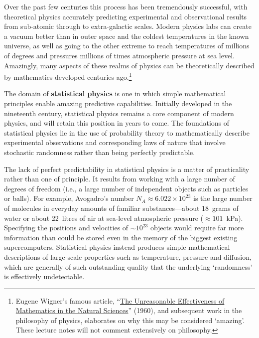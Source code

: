 \documentclass[12 pt]{article}
\begin{document}
Over the past few centuries this process has been tremendously successful, with theoretical physics accurately predicting experimental and observational results from sub-atomic through to extra-galactic scales.
Modern physics labs can create a vacuum better than in outer space and the coldest temperatures in the known universe, as well as going to the other extreme to reach temperatures of millions of degrees and pressures millions of times atmospheric pressure at sea level.
Amazingly, many aspects of these realms of physics can be theoretically described by mathematics developed centuries ago.\footnote{Eugene Wigner's famous article, ``\href{https://en.wikipedia.org/wiki/The_Unreasonable_Effectiveness_of_Mathematics_in_the_Natural_Sciences}{The Unreasonable Effectiveness of Mathematics in the Natural Sciences}'' (1960), and subsequent work in the philosophy of physics, elaborates on why this may be considered `amazing'.  These lecture notes will not comment extensively on philosophy.}

The domain of \textbf{statistical physics} is one in which simple mathematical principles enable amazing predictive capabilities.
Initially developed in the nineteenth century, statistical physics remains a core component of modern physics, and will retain this position in years to come.
The foundations of statistical physics lie in the use of probability theory to mathematically describe experimental observations and corresponding laws of nature that involve stochastic randomness rather than being perfectly predictable.

The lack of perfect predictability in statistical physics is a matter of practicality rather than one of principle.
It results from working with a large number of degrees of freedom (i.e., a large number of independent objects such as particles or balls).
For example, Avogadro's number $N_A \approx 6.022\times 10^{23}$ is the large number of molecules in everyday amounts of familiar substances---about 18~grams of water or about 22~litres of air at sea-level atmospheric pressure ($\approx$$101$~kPa). %
Specifying the positions and velocities of $\sim$$10^{23}$ objects would require far more information than could be stored even in the memory of the biggest existing supercomputers.
Statistical physics instead produces simple mathematical descriptions of large-scale properties such as temperature, pressure and diffusion, which are generally of such outstanding quality that the underlying `randomness' is effectively undetectable.
\end{document}
